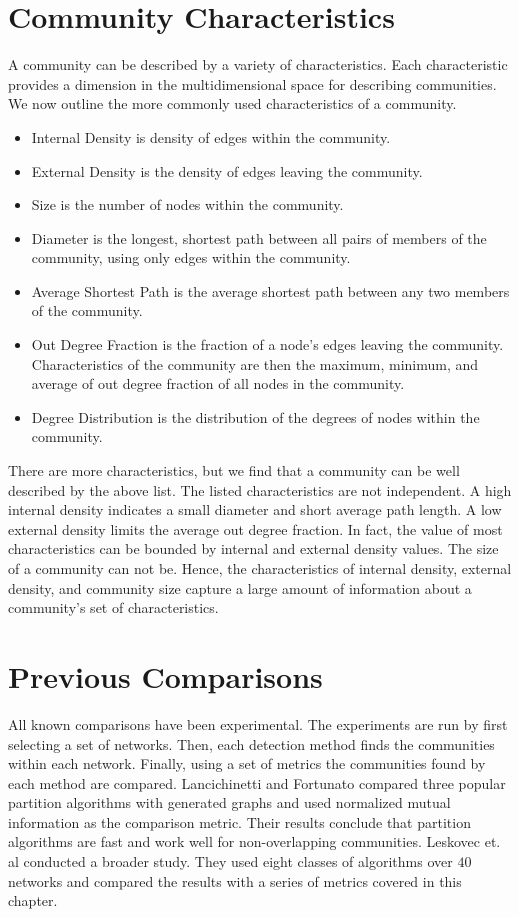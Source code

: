 \documentclass[phd,tocprelim]{cornell}
\begin{document}
\section{Community Characteristics}

A community can be described by a variety of characteristics.  Each characteristic provides a dimension in the multidimensional space for describing communities.  We now outline the more commonly used characteristics of a community.
\begin{itemize}
\item {\sc Internal Density} is density of edges within the community.
\item {\sc External Density} is the density of edges leaving the community.
\item {\sc Size} is the number of nodes within the community.
\item {\sc Diameter} is the longest, shortest path between all pairs of members of the community, using only edges within the community.
\item {\sc Average Shortest Path} is the average shortest path between any two members of the community.
\item {\sc Out Degree Fraction} is the fraction of a node's edges leaving the community.  Characteristics of the community are then the maximum, minimum, and average of out degree fraction of all nodes in the community.
\item {\sc Degree Distribution} is the distribution of the degrees of nodes within the community.
\end{itemize}
There are more characteristics, but we find that a community can be well described by the above list.  The listed characteristics are not independent.  A high internal density indicates a small diameter and short average path length.  A low external density limits the average out degree fraction.  In fact, the value of most characteristics can be bounded by internal and external density values.  The size of a community can not be.  Hence, the characteristics of internal density, external density, and community size capture a large amount of information about a community's set of characteristics.


\section{Previous Comparisons}

All known comparisons have been experimental.  The experiments are run by first selecting a set of networks.  Then, each detection method finds the communities within each network.  Finally, using a set of metrics the communities found by each method are compared.  Lancichinetti and Fortunato \cite{lanc:2009} compared three popular partition algorithms with generated graphs and used normalized mutual information as the comparison metric.  Their results conclude that partition algorithms are fast and work well for non-overlapping communities.  Leskovec et. al \cite{leskovec} conducted a broader study.  They used eight classes of algorithms over $40$ networks and compared the results with a series of metrics covered in this chapter.
\end{document}
